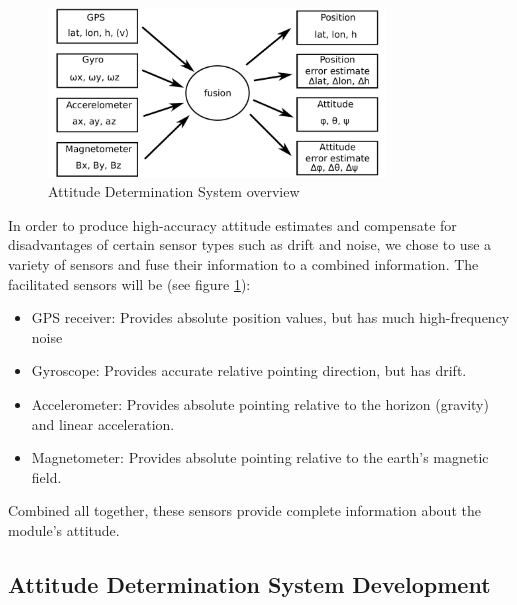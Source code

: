 \begin{figure}
\centering
\includegraphics[width=0.8\textwidth]{figures/ADS_diagram.pdf}
\caption{Attitude Determination System overview}
\label{fig:ADS_overview}
\end{figure}

\pagebreak

\noindent
In order to produce high-accuracy attitude estimates and compensate for disadvantages of certain sensor types such as drift and noise, we chose to use a variety of sensors and fuse their information to a combined information.
The facilitated sensors will be (see figure \ref{fig:ADS_overview}):
\begin{itemize}
\item GPS receiver: Provides absolute position values, but has much high-frequency noise
\item Gyroscope: Provides accurate relative pointing direction, but has drift.
\item Accelerometer: Provides absolute pointing relative to the horizon (gravity) and linear acceleration.
\item Magnetometer: Provides absolute pointing relative to the earth's magnetic field.
\end{itemize}

\noindent
Combined all together, these sensors provide complete information about the module's attitude.

\subsection{Attitude Determination System Development}
\FloatBarrier

